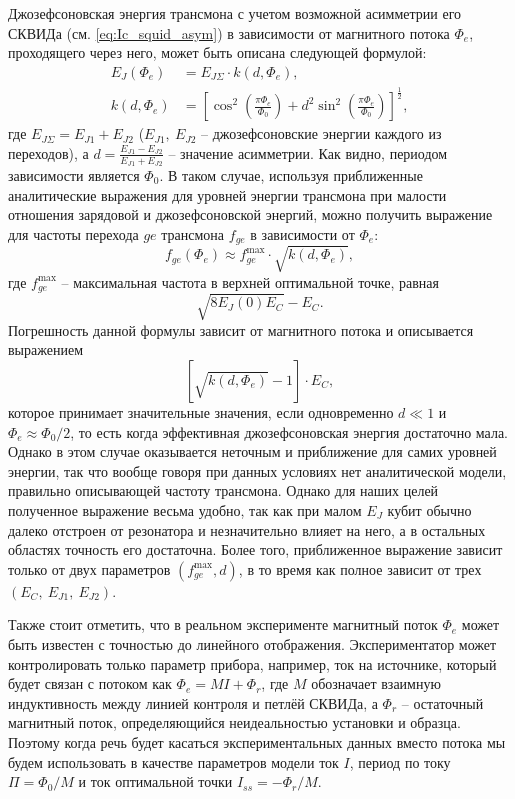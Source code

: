 \documentclass[14pt, a4paper]{extreport}
\numberwithin{equation}{section}
\begin{document}
Джозефсоновская энергия трансмона с учетом возможной асимметрии его СКВИДа (см. \eqref{eq:Ic_squid_asym}) в зависимости от магнитного потока $\Phi_e$, проходящего через него, может быть описана следующей формулой:
\begin{equation}
\begin{aligned}
E_{J}(\Phi_e) &= E_{J\Sigma} \cdot k(d, \Phi_e),\\
k(d, \Phi_e) &= \left[\cos^2\left(\frac{\pi \Phi_e}{\Phi_0}\right) +d^2 \sin^2 \left(\frac{\pi \Phi_e}{\Phi_0}\right)\right]^{\frac{1}{2}},
\label{eq:EJ_Phie}
\end{aligned}	
\end{equation}
где $E_{J\Sigma} = E_{J1}+E_{J2}$ ($E_{J1},\ E_{J2}$ -- джозефсоновские энергии каждого из переходов), а $d = \frac{E_{J1}-E_{J2}}{E_{J1}+E_{J2}}$ -- значение асимметрии. Как видно, периодом зависимости является $\Phi_0$. В таком случае, используя приближенные аналитические выражения для уровней энергии трансмона \cite{koch2007charge} при малости отношения зарядовой и джозефсоновской энергий, можно получить выражение для частоты перехода $ge$ трансмона $f_{ge}$ в зависимости от $\Phi_e$:
\begin{equation}
	f_{ge}(\Phi_e) \approx  f_{ge}^\text{max} \cdot \sqrt{k(d, \Phi_e)},
\end{equation}
где $f_{ge}^\text{max}$ -- максимальная частота в верхней оптимальной точке, равная $$\sqrt{8E_J(0) E_C} - E_C.$$
Погрешность данной формулы зависит от магнитного потока и описывается выражением 
\begin{equation}
	\left[\sqrt{k(d, \Phi_e)}-1\right] \cdot E_C,
\end{equation}
которое принимает значительные значения, если одновременно $d \ll 1$ и $\Phi_e \approx \Phi_0/2$, то есть когда эффективная джозефсоновская энергия достаточно мала. Однако в этом случае оказывается неточным и приближение для самих уровней энергии, так что вообще говоря при данных условиях нет аналитической модели, правильно описывающей частоту трансмона. Однако для наших целей полученное выражение весьма удобно, так как при малом $E_J$ кубит обычно далеко отстроен от резонатора и незначительно влияет на него, а в остальных областях точность его достаточна. Более того, приближенное выражение зависит только от двух параметров $(f_{ge}^{\text{max}}, d)$, в то время как полное зависит от трех $(E_C,\ E_{J1},\ E_{J2})$. 

Также стоит отметить, что в реальном эксперименте магнитный поток $\Phi_e$ может быть известен с точностью до линейного отображения. Экспериментатор может контролировать только параметр прибора, например, ток на источнике, который будет связан с потоком как $\Phi_e = M I + \Phi_r$, где $ M $ обозначает взаимную индуктивность между линией контроля и петлёй СКВИДа, а $\Phi_r$ -- остаточный магнитный поток, определяющийся неидеальностью установки и образца. Поэтому когда речь будет касаться экспериментальных данных вместо потока мы будем использовать в качестве параметров модели ток $I$, период по току $\Pi = \Phi_0/M$ и ток оптимальной точки $I_{ss} = - \Phi_r/M$.
\end{document}
